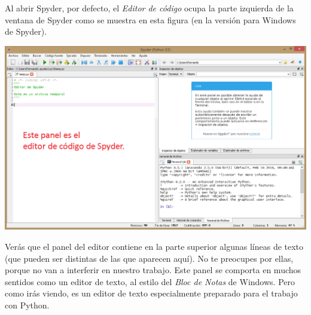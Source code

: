 \documentclass[10pt,a4paper]{article}\usepackage[]{graphicx}\usepackage[]{color}
\newcounter {cont01}
\begin{document}
Al abrir Spyder, por defecto, el {\em Editor de código} ocupa la parte izquierda de la ventana de Spyder como se muestra en esta figura (en la versión para Windows de Spyder).  
\begin{center}
\includegraphics[width=15cm]{../fig/Tut-02-py-23-PanelEditorSpyder-2.png}
\end{center}

Verás que el panel del editor contiene en la parte superior algunas líneas de texto (que pueden ser distintas de las que aparecen aquí). No te preocupes por ellas, porque no van a interferir en nuestro trabajo. Este panel se comporta en muchos sentidos como un editor de texto, al estilo del {\em Bloc de Notas} de Windows. Pero como irás viendo, es un editor de texto especialmente preparado para el trabajo con Python. 
\end{document}

